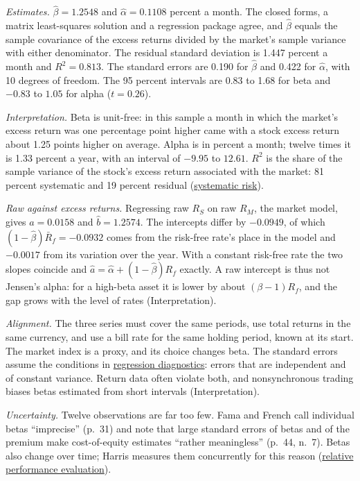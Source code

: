 \begin{qfmethod}
 \emph{Estimates.} $\hat\beta=1.2548$ and $\hat\alpha=0.1108$ percent a month. The closed forms, a matrix least-squares solution and a regression package agree, and $\hat\beta$ equals the sample covariance of the excess returns divided by the market's sample variance with either denominator. The residual standard deviation is 1.447 percent a month and $R^2=0.813$. The standard errors are 0.190 for $\hat\beta$ and 0.422 for $\hat\alpha$, with 10 degrees of freedom. The 95 percent intervals are 0.83 to 1.68 for beta and $-0.83$ to $1.05$ for alpha ($t=0.26$).

\emph{Interpretation.} Beta is unit-free: in this sample a month in which the market's excess return was one percentage point higher came with a stock excess return about 1.25 points higher on average. Alpha is in percent a month; twelve times it is 1.33 percent a year, with an interval of $-9.95$ to $12.61$. $R^2$ is the share of the sample variance of the stock's excess return associated with the market: 81 percent systematic and 19 percent residual (\hyperref[mech:systematic-risk-pricing]{systematic risk}).

\emph{Raw against excess returns.} Regressing raw $R_S$ on raw $R_M$, the market model, gives $\hat a=0.0158$ and $\hat b=1.2574$. The intercepts differ by $-0.0949$, of which $(1-\hat\beta)\bar R_f=-0.0932$ comes from the risk-free rate's place in the model and $-0.0017$ from its variation over the year. With a constant risk-free rate the two slopes coincide and $\hat a=\hat\alpha+(1-\hat\beta)R_f$ exactly. A raw intercept is thus not Jensen's alpha: for a high-beta asset it is lower by about $(\beta-1)R_f$, and the gap grows with the level of rates (Interpretation).

 \emph{Alignment.} The three series must cover the same periods, use total returns in the same currency, and use a bill rate for the same holding period, known at its start. The market index is a proxy, and its choice changes beta. The standard errors assume the conditions in \hyperref[meth:regression-diagnostics-anova]{regression diagnostics}: errors that are independent and of constant variance. Return data often violate both, and nonsynchronous trading biases betas estimated from short intervals (Interpretation).

\emph{Uncertainty.} Twelve observations are far too few. Fama and French call individual betas ``imprecise'' (p.~31) and note that large standard errors of betas and of the premium make cost-of-equity estimates ``rather meaningless'' (p.~44, n.~7). Betas also change over time; Harris measures them concurrently for this reason (\hyperref[meth:relative-performance-evaluation]{relative performance evaluation}).


\end{qfmethod}
